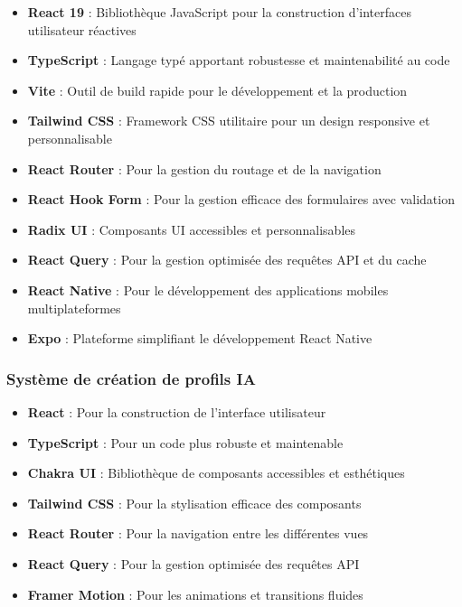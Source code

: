 \begin{itemize}
  \item \textbf{React 19} : Bibliothèque JavaScript pour la construction d'interfaces utilisateur réactives
  
  \item \textbf{TypeScript} : Langage typé apportant robustesse et maintenabilité au code
  
  \item \textbf{Vite} : Outil de build rapide pour le développement et la production
  
  \item \textbf{Tailwind CSS} : Framework CSS utilitaire pour un design responsive et personnalisable
  
  \item \textbf{React Router} : Pour la gestion du routage et de la navigation
  
  \item \textbf{React Hook Form} : Pour la gestion efficace des formulaires avec validation
  
  \item \textbf{Radix UI} : Composants UI accessibles et personnalisables
  
  \item \textbf{React Query} : Pour la gestion optimisée des requêtes API et du cache
  
  \item \textbf{React Native} : Pour le développement des applications mobiles multiplateformes
  
  \item \textbf{Expo} : Plateforme simplifiant le développement React Native
\end{itemize}

\subsubsection{Système de création de profils IA}

\begin{itemize}
  \item \textbf{React} : Pour la construction de l'interface utilisateur
  
  \item \textbf{TypeScript} : Pour un code plus robuste et maintenable
  
  \item \textbf{Chakra UI} : Bibliothèque de composants accessibles et esthétiques
  
  \item \textbf{Tailwind CSS} : Pour la stylisation efficace des composants
  
  \item \textbf{React Router} : Pour la navigation entre les différentes vues
  
  \item \textbf{React Query} : Pour la gestion optimisée des requêtes API
  
  \item \textbf{Framer Motion} : Pour les animations et transitions fluides
\end{itemize}


